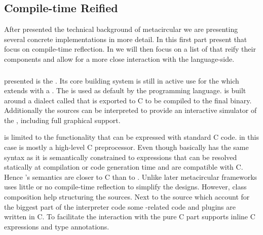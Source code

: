 \subsection{Compile-time Reified \VMs}
After presented the technical background of metacircular \VMs we are presenting several concrete implementations in more detail.
In this first part present \VMs that focus on compile-time reflection.
In  we will then focus on a list of \VMs that reify their components and allow for a more close interaction with the language-side.


\subsubsection*{\Squeak \ST \VM}
 \VMs presented is the \Squeak \VM\cite{Inga97a}.
Its core building system is still in active use for the  which extends \Squeak with a \JIT.
The \Cog \VM is used as default by the  programming language.
\Squeak is built around a \ST dialect called \Slang that is exported to C to be compiled to the final \VM binary.
Additionally the \Slang sources can be interpreted to provide an interactive simulator of the \VM, including full graphical support.

\Slang is limited to the functionality that can be expressed with standard C code.
\Slang in this case is mostly a high-level C preprocessor.
Even though \Slang basically has the same syntax as \ST it is semantically constrained to expressions that can be resolved statically at compilation or code generation time and are compatible with C.
Hence \Slang's semantics are closer to C than to \ST.
Unlike later metacircular frameworks \Squeak uses little or no compile-time reflection to simplify the \VM designs.
However, class composition help structuring the sources.
Next to the \Slang source which account for the biggest part of the interpreter code some \OS-related code and plugins are written in C.
To facilitate the interaction with the pure C part \Slang supports inline C expressions and type annotations.

